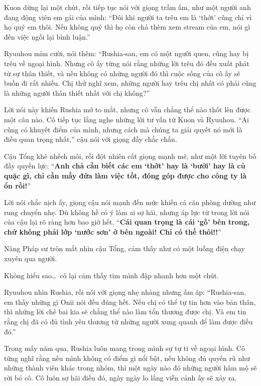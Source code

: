 \documentclass[../main.tex]{subfiles}
\begin{document}
Kuon dừng lại một chút, rồi tiếp tục nói với giọng trầm ấm, như một người anh đang động viên em gái của mình: ``Đôi khi người ta trêu em là `thớt' cũng chỉ vì họ quý em thôi. Nếu không quý thì họ còn chả thèm xem stream của em, nói gì đến việc ngồi lại bình luận.''

Ryuuhou mỉm cười, nói thêm: ``Rushia-san, em có một người quen, cũng hay bị trêu về ngoại hình. Nhưng cô ấy từng nói rằng những lời trêu đó đều xuất phát từ sự thân thiết, và nếu không có những người đó thì cuộc sống của cô ấy sẽ buồn đi rất nhiều. Chị thử nghĩ xem, những người hay trêu chị nhất có phải cũng là những người thân thiết nhất với chị không?''

Lời nói này khiến Rushia mở to mắt, nhưng cô vẫn chẳng thể nào thốt lên được một câu nào. Cô tiếp tục lắng nghe những lời tư vấn từ Kuon và Ryuuhou. ``Ai cũng có khuyết điểm của mình, nhưng cách mà chúng ta giải quyết nó mới là điều quan trọng nhất,'' cậu nói với giọng đầy chắc chắn.

Cậu Tổng khẽ nhếch môi, rồi đột nhiên cất giọng mạnh mẽ, như một lời tuyên bố đầy quyền lực: ``\textbf{Anh chả cần biết các em `thớt' hay là `bưởi' hay là củ quặc gì, chỉ cần mấy đứa làm việc tốt, đóng góp được cho công ty là ổn rồi!}''

Lời nói chắc nịch ấy, giọng cậu nói mạnh đến mức khiến cả căn phòng dường như rung chuyển nhẹ. Dù không hề có ý làm ai sợ hãi, nhưng áp lực từ trong lời nói của cậu lại rõ ràng hơn bao giờ hết. ``\textbf{Cái quan trọng là cái `gỗ' bên trong, chứ không phải lớp `nước sơn' ở bên ngoài! Chỉ có thế thôi!!}''

Nàng Pháp sư tròn mắt nhìn cậu Tổng, cảm thấy như có một luồng điện chạy xuyên qua người.

Không hiểu sao\dots\ cô lại cảm thấy tim mình đập nhanh hơn một chút.

Ryuuhou nhìn Rushia, rồi nói với giọng nhẹ nhàng nhưng ấm áp: ``Rushia-san, em thấy những gì Onii nói đều đúng hết. Nếu chị có thể tự tin hơn vào bản thân, thì những lời chê bai kia sẽ chẳng thể nào làm tổn thương được chị. Và em tin rằng chị đã có đủ tình yêu thương từ những người xung quanh để làm được điều đó.''

Trong mấy năm qua, Rushia luôn mang trong mình sự tự ti về ngoại hình. Cô từng nghĩ rằng nếu mình không có điểm gì nổi bật, nếu không đủ quyến rũ như những thành viên khác trong nhóm, thì một ngày nào đó những người hâm mộ sẽ rời bỏ cô. Cô luôn sợ hãi điều đó, ngày ngày lo lắng viễn cảnh ấy sẽ xảy ra.
\end{document}
